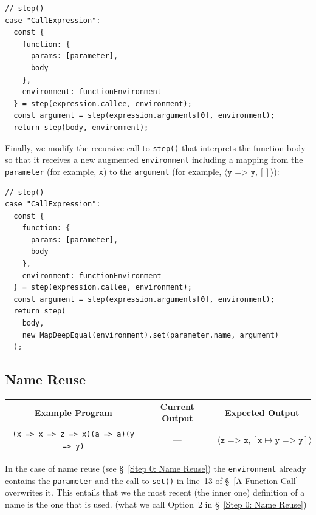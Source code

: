 \documentclass[12pt, oneside]{book}
\begin{document}
\begin{verbatim}
// step()
case "CallExpression":
  const {
    function: {
      params: [parameter],
      body
    },
    environment: functionEnvironment
  } = step(expression.callee, environment);
  const argument = step(expression.arguments[0], environment);
  return step(body, environment);
\end{verbatim}

Finally, we modify the recursive call to \texttt{step()} that interprets the function body so that it receives a new augmented \texttt{environment} including a mapping from the \texttt{parameter} (for example, \texttt{x}) to the \texttt{argument} (for example, $\langle \texttt{y => y}, [] \rangle$):

\begin{verbatim}
// step()
case "CallExpression":
  const {
    function: {
      params: [parameter],
      body
    },
    environment: functionEnvironment
  } = step(expression.callee, environment);
  const argument = step(expression.arguments[0], environment);
  return step(
    body,
    new MapDeepEqual(environment).set(parameter.name, argument)
  );
\end{verbatim}

\subsection{Name Reuse}

\begin{center}
\begin{tabular}{c|c|c}
\textbf{Example Program} & \textbf{Current Output} & \textbf{Expected Output} \\
\texttt{(x => x => z => x)(a => a)(y => y)} & — & $\langle \texttt{z => x}, [\texttt{x} \mapsto \texttt{y => y}] \rangle$ \\
\end{tabular}
\end{center}

In the case of name reuse (see §~\ref{Step 0: Name Reuse}) the \texttt{environment} already contains the \texttt{parameter} and the call to \texttt{set()} in line~13 of §~\ref{A Function Call} overwrites it. This entails that we  the most recent (the inner one) definition of a name is the one that is used.
(what we call Option~2 in §~\ref{Step 0: Name Reuse})
\end{document}
